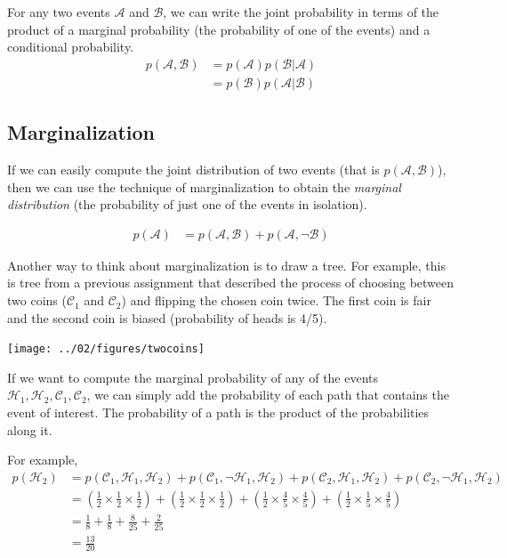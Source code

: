 \documentclass[review_Solutions]{subfiles}
\begin{document}
For any two events $\mathcal{A}$ and $\mathcal{B}$, we can write the joint probability in terms of the product of a marginal probability (the probability of one of the events) and a conditional probability.
\begin{align}
p(\mathcal{A}, \mathcal{B}) &= p(\mathcal{A}) p( \mathcal{B} | \mathcal{A})  \\
&= p(\mathcal{B}) p( \mathcal{A} | \mathcal{B})
\end{align}


\subsection{Marginalization}
If we can easily compute the joint distribution of two events (that is $p(\mathcal{A}, \mathcal{B})$), then we can use the technique of marginalization to obtain the \emph{marginal distribution} (the probability of just one of the events in isolation).

\begin{align}
p(\mathcal{A}) &= p(\mathcal{A}, \mathcal{B}) + p(\mathcal{A}, \neg \mathcal{B})
\end{align}


Another way to think about marginalization is to draw a tree.  For example, this is tree from a previous assignment that described the process of choosing between two coins ($\mathcal{C}_1$ and $\mathcal{C}_2$) and flipping the chosen coin twice.  The first coin is fair and the second coin is biased (probability of heads is 4/5).

\begin{center}
\texttt{[image: ../02/figures/twocoins]}
\end{center}

If we want to compute the marginal probability of any of the events $\mathcal{H}_1, \mathcal{H}_2, \mathcal{C}_1, \mathcal{C}_2$, we can simply add the probability of each path that contains the event of interest.  The probability of a path is the product of the probabilities along it.

For example,
\begin{align}
p(\mathcal{H}_2) &= p(\mathcal{C}_1, \mathcal{H}_1, \mathcal{H}_2) + p(\mathcal{C}_1, \neg \mathcal{H}_1, \mathcal{H}_2) + p(\mathcal{C}_2, \mathcal{H}_1, \mathcal{H}_2) + p(\mathcal{C}_2, \neg \mathcal{H}_1, \mathcal{H}_2) \nonumber \\
&= \left ( \frac{1}{2} \times \frac{1}{2} \times \frac{1}{2} \right) + \left ( \frac{1}{2} \times \frac{1}{2} \times \frac{1}{2} \right) + \left ( \frac{1}{2} \times \frac{4}{5} \times \frac{4}{5} \right) + \left ( \frac{1}{2} \times \frac{1}{5} \times \frac{4}{5} \right) \nonumber \\
&= \frac{1}{8} + \frac{1}{8} + \frac{8}{25} + \frac{2}{25} \nonumber \\
&= \frac{13}{20} \nonumber
\end{align}
\end{document}
